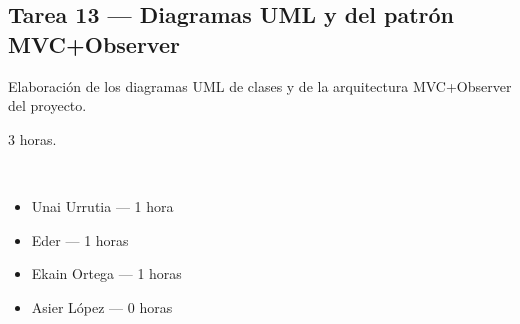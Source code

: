 \documentclass[12pt, a4paper]{article}
\begin{document}
\vspace{0.8em}

\subsection*{Tarea 13 — Diagramas UML y del patrón MVC+Observer}
\begin{description}[leftmargin=2em, style=nextline]
    \item[\textbf{Descripción:}] Elaboración de los diagramas UML de clases y de la arquitectura MVC+Observer del proyecto.
    \item[\textbf{Tiempo:}] 3 horas.
    \item[\textbf{Responsables y dedicación:}]~
        \begin{itemize}[leftmargin=1em, nosep]
            \item Unai Urrutia — 1 hora
            \item Eder — 1 horas
            \item Ekain Ortega — 1 horas
            \item Asier López — 0 horas
        \end{itemize}
\end{description}
\end{document}
